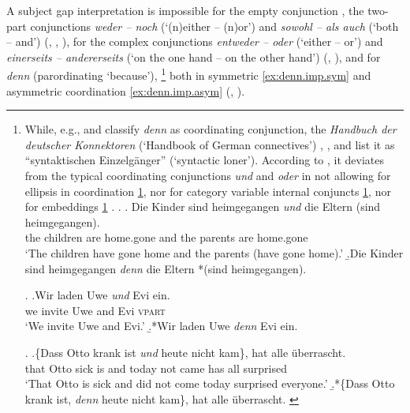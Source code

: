 A subject gap  interpretation is impossible for the empty conjunction  \citep[361]{reich2013}, the two-part conjunctions \textit{weder -- noch} (`(n)either -- (n)or') and \textit{sowohl -- als auch} (`both -- and') (\cite[14]{hohle1983}, \cite[310]{wunderlich1988}, \cite[361]{reich2013}), for the complex conjunctions \textit{entweder -- oder} (`either -- or') and \textit{einerseits -- andererseits} (`on the one hand -- on the other hand') (\cite[93]{reich2009}, \cite[361]{reich2013}), and for \textit{denn} (parordinating `because'),%
\footnote{\label{note:denn}While, e.g., \citet[60]{zifonun.etal1997} and \citet[216]{eisenberg2020} classify \textit{denn} as coordinating conjunction,  the \textit{Handbuch der deutscher Konnektoren} (`Handbook of German connectives') \citep[584]{pasch.etal2003}, \citet[549]{reich.reis2013}, and \citet[16]{breindl2017} list it as ``syntaktischen Einzelgänger'' (`syntactic loner').
According to \citet[15]{breindl2017}, it deviates from the typical coordinating conjunctions  \textit{und} and \textit{oder} in not allowing for ellipsis in coordination \ref{ex:denn.ell}, nor for category variable internal conjuncts \ref{ex:denn.variable}, nor for embeddings  \ref{ex:denn.emb} \citep[see also][549]{reich.reis2013}.
\ex.\label{ex:denn.ell}
\ag. Die Kinder sind heimgegangen \emph{und} die Eltern (sind heimgegangen).\\
the children are home.gone and the parents are home.gone\\
`The children have gone home and the parents (have gone home).'
\b.Die Kinder sind heimgegangen \emph{denn} die Eltern *(sind heimgegangen). \citep[15]{breindl2017}

\ex.\label{ex:denn.variable}
\ag.Wir laden Uwe \emph{und} Evi ein.\\
we invite Uwe and Evi \textsc{vpart}\\
`We invite Uwe and Evi.'
\b.*Wir laden Uwe \emph{denn} Evi ein. \citep[15]{breindl2017}

\ex.\label{ex:denn.emb}
\ag.\{Dass Otto krank ist \emph{und} heute nicht kam\}, hat alle überrascht.\\
that Otto sick is and today not came has all surprised\\
`That Otto is sick and did not come today surprised everyone.'
\b.*\{Dass Otto krank ist, \emph{denn} heute nicht kam\}, hat alle überrascht. \citep[15]{breindl2017}

}
%
both in symmetric \ref{ex:denn.imp.sym} and asymmetric coordination \ref{ex:denn.imp.asym} (\cite[508]{vandevelde1986}, \cite[54]{bonitz2013}).

